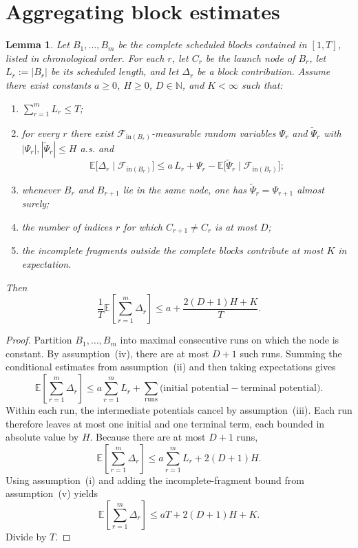\documentclass[12pt]{article}
\newtheorem{lemma}[theorem]{Lemma}
\theoremstyle{definition}
\newcommand{\N}{\mathbb{N}}
\newcommand{\E}{\mathbb{E}}
\newcommand{\1}{\mathbf{1}}
\newcommand{\cF}{\mathcal{F}}
\begin{document}
\section{Aggregating block estimates}
\label{app:aggregation}

\begin{lemma}
\label{lem:aggregation}
Let $B_1,\dots,B_m$ be the complete scheduled blocks contained in $[1,T]$,
listed in chronological order. For each $r$, let $C_r$ be the launch node of
$B_r$, let $L_r:=|B_r|$ be its scheduled length, and let $\Delta_r$ be a
block contribution.
Assume there exist constants $a\ge 0$, $H\ge 0$, $D\in\N$, and $K<\infty$ such that:
\begin{enumerate}[label=\textnormal{(\roman*)},leftmargin=2.6em]
\item $\sum_{r=1}^m L_r\le T$;
\item for every $r$ there exist $\cF_{\mathrm{in}(B_r)}$-measurable random variables
$\Psi_r$ and $\widetilde\Psi_r$ with $|\Psi_r|,|\widetilde\Psi_r|\le H$ a.s. and
\[
\E\bigl[\Delta_r\mid \cF_{\mathrm{in}(B_r)}\bigr]
\le
a\,L_r
+
\Psi_r-\E\bigl[\widetilde\Psi_r\mid \cF_{\mathrm{in}(B_r)}\bigr];
\]
\item whenever $B_r$ and $B_{r+1}$ lie in the same node, one has
$\widetilde\Psi_r=\Psi_{r+1}$ almost surely;
\item the number of indices $r$ for which $C_{r+1}\neq C_r$ is at most $D$;
\item the incomplete fragments outside the complete blocks contribute at most $K$
in expectation.
\end{enumerate}
Then
\[
\frac1T\E\left[\sum_{r=1}^m \Delta_r\right]
\le a + \frac{2(D+1)H+K}{T}.
\]
\end{lemma}

\begin{proof}
Partition $B_1,\dots,B_m$ into maximal consecutive runs on which the node is
constant. By assumption~(iv), there are at most $D+1$ such runs. Summing the
conditional estimates from assumption~(ii) and then taking expectations gives
\[
\E\left[\sum_{r=1}^m \Delta_r\right]
\le
a\sum_{r=1}^m L_r
+
\sum_{\text{runs}}
\bigl(\text{initial potential} - \text{terminal potential}\bigr).
\]
Within each run, the intermediate potentials cancel by assumption~(iii). Each run
therefore leaves at most one initial and one terminal term, each bounded in
absolute value by $H$. Because there are at most $D+1$ runs,
\[
\E\left[\sum_{r=1}^m \Delta_r\right]
\le
a\sum_{r=1}^m L_r + 2(D+1)H.
\]
Using assumption~(i) and adding the incomplete-fragment bound from assumption~(v)
yields
\[
\E\left[\sum_{r=1}^m \Delta_r\right]
\le
aT + 2(D+1)H + K.
\]
Divide by $T$.
\end{proof}
\end{document}

